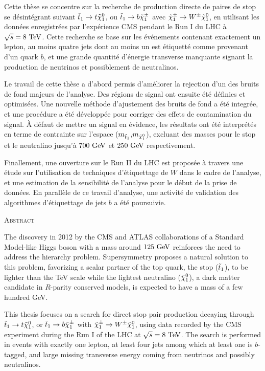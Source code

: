     Cette thèse se concentre sur la recherche de production directe de paires de stop
se désintégrant suivant $\tilde{t}_1 \rightarrow t \tilde{\chi}_1^0$, ou $\tilde{t}_1 \rightarrow b
\tilde{\chi}_1^\pm$ avec $\tilde{\chi}_1^\pm \rightarrow W^\pm \tilde{\chi}_1^0$, en utilisant les données
enregistrées par l'expérience CMS pendant le Run I du LHC à $\sqrt{s} = 8~\text{TeV}$. Cette recherche
se base sur les événements contenant exactement un lepton, au moins quatre jets dont au moins
un est étiquetté comme provenant d'un quark $b$, et une grande quantité d'énergie transverse
manquante signant la production de neutrinos et possiblement de neutralinos.

    Le travail de cette thèse a d'abord permis d'améliorer la rejection d'un des bruits
de fond majeurs de l'analyse. Des régions de signal ont ensuite été définies et optimisées.
Une nouvelle méthode d'ajustement des bruits de fond a été integrée, et une procédure a été développée pour corriger des effets de contamination
du signal. À défaut de mettre un signal en évidence, les résultats ont été interprétés en
terme de contrainte sur l'espace ($m_{\tilde{t}_1}$,$m_{\tilde{\chi}_1^0}$), excluant des masses
pour le stop et le neutralino jusqu'à $700~\text{GeV}$ et $250~\text{GeV}$ respectivement.

    Finallement, une ouverture sur le Run II du LHC est proposée à travers une étude sur
l'utilisation de techniques d'étiquettage de $W$ dans le cadre de l'analyse, et une
estimation de la sensibilité de l'analyse pour le début de la prise de données. En parallèle
de ce travail d'analyse, une activité de validation des algorithmes d'étiquettage de jets $b$
a été poursuivie.

\begin{center}\textsc{Abstract}\end{center}
    \vspace*{-0.2cm}
    The discovery in 2012 by the CMS and ATLAS collaborations of a Standard Model-like Higgs boson
with a mass around $125~\text{GeV}$ reinforces the need to address the hierarchy problem. Supersymmetry
proposes a natural solution to this problem, favorizing a scalar partner of the top quark,
the stop ($\tilde{t}_1$), to be lighter than the TeV scale while the lightest neutralino
($\tilde{\chi}_1^0$), a dark matter candidate in $R$-parity conserved models, is expected to have
a mass of a few hundred GeV.

    This thesis focuses on a search for direct stop pair production decaying through
$\tilde{t}_1 \rightarrow t \tilde{\chi}_1^0$, or $\tilde{t}_1 \rightarrow b \tilde{\chi}_1^\pm$ with
$\tilde{\chi}_1^\pm \rightarrow W^\pm \tilde{\chi}_1^0$, using data recorded by the CMS experiment during
the Run I of the LHC at $\sqrt{s} = 8~\text{TeV}$. The search is performed in events with exactly
one lepton, at least four jets among which at least one is $b$-tagged, and large missing
transverse energy coming from neutrinos and possibly neutralinos.

